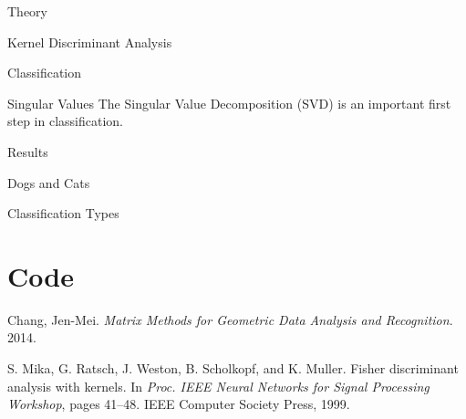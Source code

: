\begin{section}{Theory}
\begin{subsection}{Kernel Discriminant Analysis}
\end{subsection}



\begin{homeworkSection}{Classification}

\end{homeworkSection}


\begin{homeworkSection}{Singular Values}
The Singular Value Decomposition (SVD) is an important first step in classification.
\end{homeworkSection}

\end{section}


\begin{section}{Results}
\begin{homeworkSection}{Dogs and Cats}
\end{homeworkSection}

\begin{homeworkSection}{Classification Types}

\end{homeworkSection}


\end{section}

\newpage

\appendix

\section{Code}\label{code}

%


\begin{thebibliography}{10}
    Chang, Jen-Mei. \textit{Matrix Methods for Geometric Data Analysis and Recognition}. 2014.

	S. Mika, G. Ratsch, J. Weston, B. Scholkopf, and K. Muller. Fisher discriminant analysis with kernels. In \textit{Proc. IEEE Neural Networks for Signal Processing Workshop}, pages 41–48. IEEE Computer Society Press, 1999.

\end{thebibliography}


